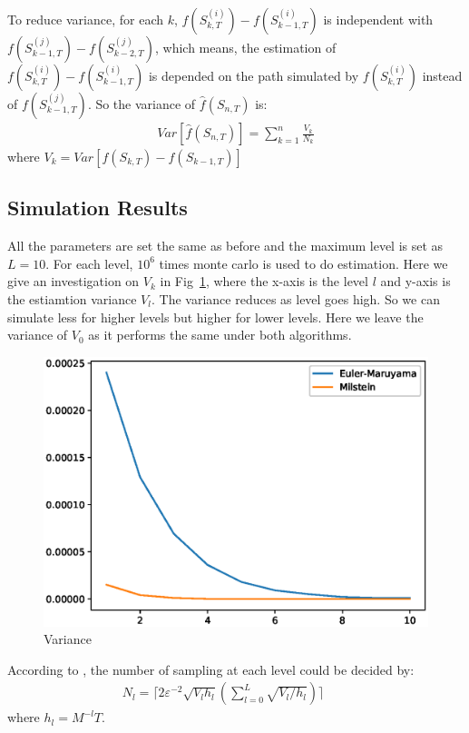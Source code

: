 \documentclass{article} %
\begin{document}
To reduce variance, for each $k$, $f(S_{k,T}^{(i)})-f(S_{k-1,T}^{(i)})$ is independent with $f(S_{k-1,T}^{(j)})-f(S_{k-2,T}^{(j)})$, which means, the estimation of $f(S_{k,T}^{(i)})-f(S_{k-1,T}^{(i)})$ is depended on the path simulated by $f(S_{k, T}^{(i)})$ instead of $f(S_{k-1, T}^{(j)})$. So the variance of $\widehat{f}(S_{n, T})$ is:
\begin{align}
  Var[\widehat{f}(S_{n, T})]=\sum_{k=1}^{n}\frac{V_{k}}{N_{k}}
\end{align}
where $V_{k}=Var[f(S_{k, T})-f(S_{k-1, T})]$
\subsection{Simulation Results}
All the parameters are set the same as before and the maximum level is set as $L=10$. For each level, $10^{6}$ times monte carlo is used to do estimation. Here we give an investigation on $V_{k}$ in Fig~\ref{fig:3}, where the x-axis is the level $l$ and y-axis is the estiamtion variance $V_{l}$. The variance reduces as level goes high. So we can simulate less for higher levels but higher for lower levels. Here we leave the variance of $V_{0}$ as it performs the same under both algorithms.
\begin{figure}[htbp!]
  \centering
  \includegraphics[width=\textwidth]{mmc-var.eps}
  \caption{Variance}
  \label{fig:3}
\end{figure}

According to \cite{Giles2008Multilevel}, the number of sampling at each level could be decided by:
\begin{align}
  N_{l} = \biggl\lceil 2\varepsilon^{-2}\sqrt{V_{l}h_{l}}(\sum_{l=0}^{L}\sqrt{V_{l}/h_{l}})\biggr\rceil\qquad
\end{align}
where $h_{l}=M^{-l}T$.
\end{document}

